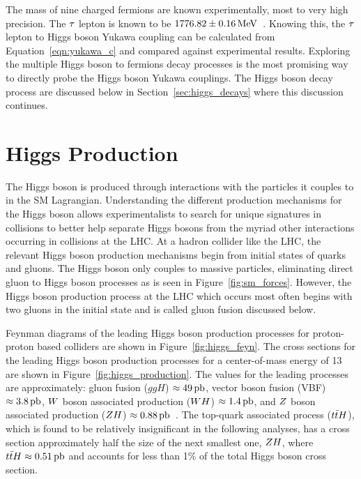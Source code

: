 The mass of nine charged fermions are known experimentally, most to very high precision.
The $\tau$ lepton is known to be $1776.82\pm0.16\,\mathrm{MeV}$~\cite{PDG}.
Knowing this, the $\tau$ lepton to Higgs boson Yukawa coupling can be calculated from 
Equation~\ref{eqn:yukawa_c} and compared against experimental results. 
Exploring the multiple Higgs boson to fermions decay processes is the most promising way to directly probe
the Higgs boson Yukawa couplings. The Higgs boson decay process are discussed below in 
Section~\ref{sec:higgs_decays} where this discussion continues.




\section{Higgs Production}
\label{sec:higgs_production}
The Higgs boson is produced through interactions with the particles it couples to in the SM
Lagrangian. Understanding the different production mechanisms for the Higgs boson
allows experimentalists to search for unique signatures in collisions to better
help separate Higgs bosons from the myriad other interactions occurring in collisions at the LHC.
At a hadron collider like the LHC, the relevant Higgs boson production
mechanisms begin from initial states of quarks and gluons. The Higgs boson
only couples to massive particles, eliminating direct gluon to Higgs boson processes
as is seen in Figure~\ref{fig:sm_forces}.
However, the Higgs boson production process at the LHC which occurs most often
begins with two gluons in the initial state and is called gluon fusion discussed below.

Feynman diagrams of the leading Higgs boson production processes for
proton-proton based colliders are shown in Figure~\ref{fig:higgs_feyn}. 
The cross sections for the leading Higgs boson production processes for a 
center-of-mass energy of 13\TeV
are shown in Figure~\ref{fig:higgs_production}. The values for the leading
processes are approximately: gluon fusion ($ggH$) $\approx 49\,\mathrm{pb}$, 
vector boson fusion (VBF) $\approx 3.8\,\mathrm{pb}$, $W$ boson associated production ($WH$) $\approx 1.4\,\mathrm{pb}$,
and $Z$ boson associated production ($ZH$) $\approx 0.88\,\mathrm{pb}$~\cite{deFlorian:2016spz}. 
The top-quark associated process ($t\bar{t}H$),
which is found to be relatively insignificant in the following analyses, has a cross
section approximately half the size of the next smallest one, $ZH$, where
$t\bar{t}H \approx 0.51\,\mathrm{pb}$ and accounts for less than 1\% of the total Higgs boson
cross section.


